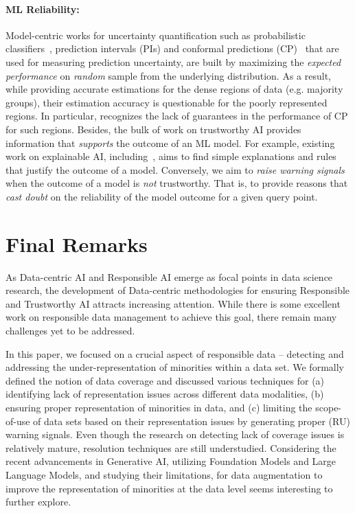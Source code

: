 \documentclass[11pt]{article}
\begin{document}
\paragraph{ML Reliability:} Model-centric works for uncertainty quantification such as 
probabilistic classifiers~\cite{zadrozny2001obtaining,zadrozny2002transforming,platt1999probabilistic,niculescu2005predicting},
prediction intervals (PIs) \cite{chatfield93predictionintervals,pearce2018high,khosravi2010lower} and conformal predictions (CP)~\cite{angelopoulos2021gentle,shafer2008tutorial} that are used for measuring prediction uncertainty, are built
by maximizing the {\it expected performance} on {\it random} sample from the underlying distribution.
As a result, while providing accurate estimations for the dense regions of data (e.g. majority groups), their estimation accuracy is questionable for the poorly represented regions.
In particular, \cite{angelopoulos2021gentle} recognizes the lack of guarantees in the performance of CP for such regions.
Besides, the bulk of work on trustworthy AI provides information that {\it supports} the outcome of an ML model. For example, existing work on explainable AI, including~\cite{harradon2018causal,ribeiro2016should,gunning2019darpa}, aims to find simple explanations and rules that justify the outcome of a model.
Conversely, we aim to {\it raise warning signals} when the outcome of a model is {\it not} trustworthy. That is, to provide reasons that {\it cast doubt} on the reliability of the model outcome {for a given query point}.

\section{Final Remarks}\label{sec:conclusion}
As Data-centric AI and Responsible AI emerge as focal points in data science research, the development of Data-centric methodologies for ensuring Responsible and Trustworthy AI attracts increasing attention.
While there is some excellent work on responsible data management to achieve this goal, there remain many challenges yet to be addressed.

In this paper, we focused on a crucial aspect of responsible data -- detecting and addressing the under-representation of minorities within a data set.
We formally defined the notion of data coverage and discussed various techniques for (a) identifying lack of representation issues across different data modalities, (b) ensuring proper representation of minorities in data, and (c) limiting the scope-of-use of data sets based on their representation issues by generating proper ({\sc RU}) warning signals.
Even though the research on detecting lack of coverage issues is relatively mature, resolution techniques are still understudied.
Considering the recent advancements in Generative AI, utilizing Foundation Models and Large Language Models, and studying their limitations, for data augmentation to improve the representation of minorities at the data level seems interesting to further explore.
\end{document}
